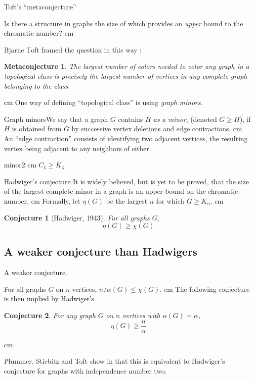 \documentclass{beamer}
\newtheorem{conjecture}{Conjecture}
\newtheorem{mconj}{Metaconjecture}
\newcommand{\bframe}[2]{\begin{frame}{#1}#2\end{frame}}
\begin{document}
\bframe{Toft's ``metaconjecture''}{

Is there a structure in graphs the size of which provides an {\it upper } bound to the chromatic number?\pause\vskip 0.5 cm 

Bjarne Toft framed the question in this way \cite{MR1411244}: \pause
\begin{mconj}
The largest number of colors needed to color any graph in a topological class is precisely the largest number of vertices in any complete graph belonging to the class
\end{mconj}\pause\vskip 0.25 cm 
One way of defining ``topological class'' is using {\it graph minors}.
}


\bframe{Graph minors}{We say that a graph $G$ contains $H$ \textit{as a minor}, (denoted $G\geq H$), if $H$ is obtained from $G$ by successive vertex deletions and edge contractions.\pause \vskip 0.5 cm
An ``edge contraction'' consists of identifying two adjacent vertices, the resulting vertex being adjacent to any neighbors of either.\pause

\begin{center}
  \quad\pause
  {minor2}\quad\pause
 \pause
\vskip 0.25 cm 
$C_5 \geq K_3$
\end{center}

	 }

\bframe{Hadwiger's conjecture}{
    It is widely believed, but is yet to be proved, that the size of the largest complete minor in a graph is an upper bound on the chromatic number. \pause
\vskip 0.5 cm Formally, let $\eta(G)$ be the largest $n$ for which $G \geq K_n$.\pause
 \vskip 0.5 cm \begin{conjecture}[Hadwiger, 1943] For all graphs $G$, \[\eta(G) \geq \chi(G)\] 
\end{conjecture}
 }

\subsection{A weaker conjecture than Hadwigers}

\bframe{A weaker conjecture.}{

	For all graphs $G$ on $n$ vertices, $n/\alpha(G) \leq \chi(G)$.\pause\vskip 0.5 cm
 The following conjecture is then implied by Hadwiger's.\pause
\begin{conjecture}\label{hc}
 For any graph $G$ on $n$ vertices with $\alpha(G) =\alpha$, \[\eta(G) \geq \frac{n}{\alpha}\]
\end{conjecture}
\pause \vskip 0.25 cm

Plummer, Stiebitz and Toft  show in \cite{MR2070161} that this is equivalent to Hadwiger's conjecture for graphs with independence number two.

}
\end{document}
